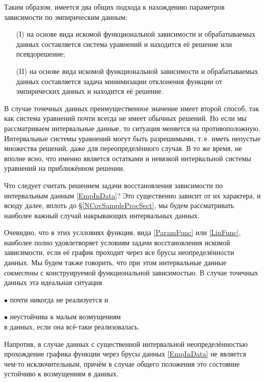 \documentclass[a5paper,openany]{book}
\begin{document}
Таким образом, имеется два общих подхода к нахождению параметров зависимости 
по эмпирическим данным: 
\begin{itemize} 
\item[(I)]  
на основе вида искомой функциональной зависимости и обрабатываемых данных 
составляется система уравнений и находится её решение или псевдорешение; 
\item[(II)]  
на основе вида искомой функциональной зависимости и обрабатываемых данных 
составляется задача минимизации отклонения функции от эмпирических данных 
и находится её решение. 
\end{itemize} 
В случае точечных данных преимущественное значение имеет второй способ, так как система 
уравнений почти всегда не имеет обычных решений. Но если мы рассматриваем интервальные 
данные, то ситуация меняется на противоположную. Интервальные системы уравнений могут 
быть разрешимыми, т.\,е. иметь непустые множества решений, даже для переопределённого 
случая. В то же время, не вполне ясно, что именно является остатками и невязкой 
интервальной системы уравнений на приближённом решении. 
   
Что следует считать решением задачи восстановления зависимости по интервальным данным 
\eqref{EmpInData}? Это существенно зависит от их характера, и всюду далее, вплоть до 
\S\ref{NCovSampleProcSect}, мы будем рассматривать наиболее важный случай накрывающих 
интервальных данных. 
  
Очевидно, что в этих услловиях функция, вида \eqref{ParamFunc} или \eqref{LinFunc}, 
наиболее полно удовлетворяет условиям задачи восстановления искомой зависимости, если 
её график проходит через все брусы неопределённости данных. Мы будем также говорить, 
что при этом интервальные данные \emph{совместны}
с конструируемой функциональной зависимостью. В случае точечных данных эта идеальная 
ситуация 
\begin{list}{}{\itemsep=1pt\topsep=2pt\parsep=2pt}
\item[$\bullet$] 
почти никогда не реализуется и 
\item[$\bullet$] 
неустойчива к малым возмущениям \\ 
в данных, если она всё-таки реализовалась. 
\end{list} 
Напротив, в случае данных с существенной интервальной неопределённостью прохождение 
графика функции через брусы данных \eqref{EmpInData} не является чем-то исключительным, 
причём в случае общего положения это состояние устойчиво к возмущениям в данных. 
  
\end{document}
